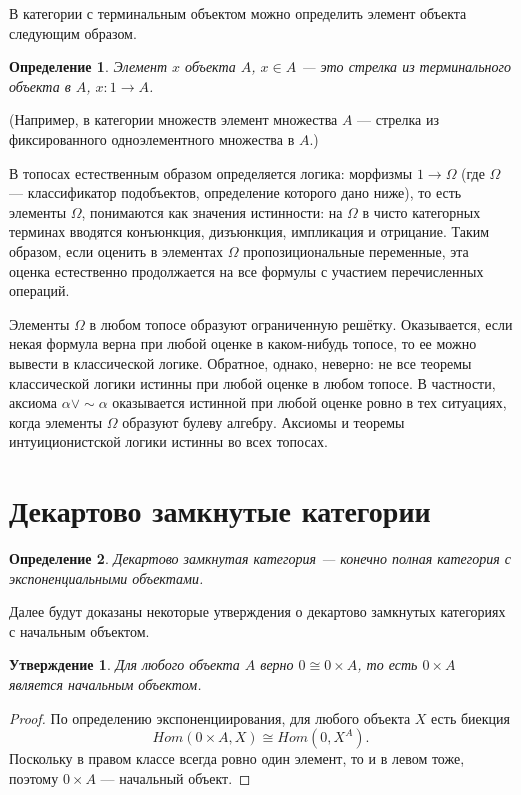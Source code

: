 \documentclass[a4paper, 12pt]{article}
\newtheorem{definition}{Определение}
\newtheorem{exercise}{Утверждение}
\begin{document}
В категории с терминальным объектом можно определить элемент объекта следующим образом.

\begin{definition}
Элемент $x$ объекта $A$, $x\in A$ --- это стрелка из терминального объекта в $A$, $x\colon1\to A$. 
\end{definition}

(Например, в категории множеств элемент множества $A$ --- стрелка из фиксированного одноэлементного множества в $A$.)

В топосах естественным образом определяется логика: морфизмы $1\to\Omega$ (где $\Omega$ --- классификатор подобъектов, определение которого дано ниже), то есть элементы $\Omega$, понимаются как значения истинности: на $\Omega$ в чисто категорных терминах вводятся конъюнкция, дизъюнкция, импликация и отрицание. Таким образом, если оценить в элементах $\Omega$ пропозициональные переменные, эта оценка естественно продолжается на все формулы с участием перечисленных операций. 

Элементы $\Omega$ в любом топосе образуют ограниченную решётку. Оказывается, если некая формула верна при любой оценке в каком-нибудь топосе, то ее можно вывести в классической логике. Обратное, однако, неверно: не все теоремы классической логики истинны при любой оценке в любом топосе. В частности, аксиома $\alpha \vee \sim\alpha$ оказывается истинной при любой оценке ровно в тех ситуациях, когда элементы $\Omega$ образуют булеву алгебру. Аксиомы и теоремы интуиционистской логики истинны во всех топосах.
\pagebreak

\section{Декартово замкнутые категории}

\begin{definition}
Декартово замкнутая категория --- конечно полная категория с экспоненциальными объектами.
\end{definition}

Далее будут доказаны некоторые утверждения о декартово замкнутых категориях с начальным объектом.

\begin{exercise}
Для любого объекта $A$ верно $0\cong 0\times A$, то есть $0\times A$ является начальным объектом. 
\end{exercise}
\begin{proof}
По определению экспоненциирования, для любого объекта $X$ есть биекция
  $$Hom(0\times A, X) \cong Hom(0, X^A).$$
Поскольку в правом классе всегда ровно один элемент, то и в левом тоже,
поэтому $0\times A$ --- начальный объект.
\end{proof}
\end{document}
